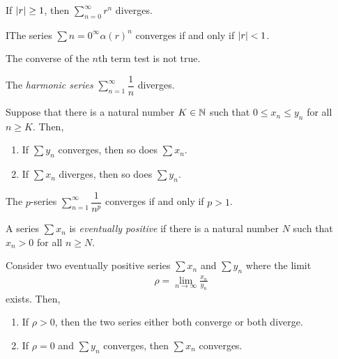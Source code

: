 \documentclass{article}
\begin{document}
\begin{theorem}
  If $\abs{r} \geq 1$, then $\sum\limits_{n = 0}^\infty r^n$ diverges.
\end{theorem}

\begin{corollary}
  IThe series $\sum\limits{n = 0}^\infty \alpha(r)^n$ converges if and only if $\abs{r} < 1$.
\end{corollary}

The converse of the $n$th term test is not true.

\begin{theorem}
  The \emph{harmonic series} $\sum\limits_{n = 1}^\infty \dfrac{1}{n}$ diverges.
\end{theorem}

\begin{theorem}
  Suppose that there is a natural number $K \in \mathbb{N}$ such that $0 \leq x_n \leq y_n$ for all $n \geq K$.
  Then,
  \begin{enumerate}
    \item If $\sum y_n$ converges, then so does $\sum x_n$.
    \item If $\sum x_n$ diverges, then so does $\sum y_n$.
  \end{enumerate}
\end{theorem}

\begin{theorem}
  The $p$-series $\sum\limits_{n = 1}^\infty \dfrac{1}{n^p}$ converges if and only if $p > 1$.
\end{theorem}

\begin{definition}
  A series $\sum x_n$ is \emph{eventually positive} if there is a natural number $N$ such that $x_n > 0$ for all $n \geq N$.
\end{definition}

\begin{theorem}
  Consider two eventually positive series $\sum x_n$ and $\sum y_n$ where the limit
  \begin{align}
    \rho = \lim_{n \to \infty} \frac{x_n}{y_n}
  \end{align}
  exists.
  Then,
  \begin{enumerate}
    \item If $\rho > 0$, then the two series either both converge or both diverge.
    \item If $\rho = 0$ and $\sum y_n$ converges, then $\sum x_n$ converges.
  \end{enumerate}
\end{theorem}
\end{document}
